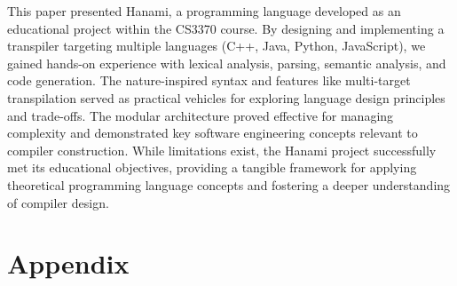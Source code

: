 \documentclass[conference]{IEEEtran}
\begin{document}
This paper presented Hanami, a programming language developed as an educational project within the CS3370 course. By designing and implementing a transpiler targeting multiple languages (C++, Java, Python, JavaScript), we gained hands-on experience with lexical analysis, parsing, semantic analysis, and code generation. The nature-inspired syntax and features like multi-target transpilation served as practical vehicles for exploring language design principles and trade-offs. The modular architecture proved effective for managing complexity and demonstrated key software engineering concepts relevant to compiler construction. While limitations exist, the Hanami project successfully met its educational objectives, providing a tangible framework for applying theoretical programming language concepts and fostering a deeper understanding of compiler design.





\newpage
\section{Appendix}
\end{document}

